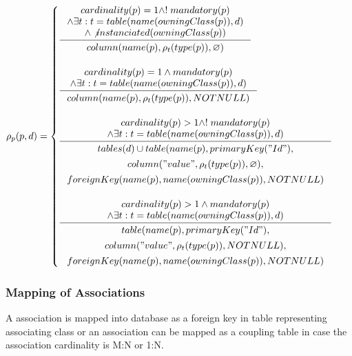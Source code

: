 \documentclass[11pt]{article}
\begin{document}
$\rho_p(p, d) = \begin{cases}
  \inference{cardinality(p) = 1 \wedge !\;mandatory(p)
 \\ \wedge \exists t : t = table(name(owningClass(p)), d) 
 \\ \wedge \not instanciated(owningClass(p))
 }{\begin{gathered}
	  column(name(p), \rho_t(type(p)), \varnothing )
\end{gathered}
 } \\ \\

  \inference{cardinality(p) = 1 \wedge mandatory(p)
 \\ \wedge \exists t : t = table(name(owningClass(p)), d)}{\begin{gathered}
 	 column(name(p), \rho_t(type(p)), NOTNULL ) \\ 
\end{gathered}} 
\\ \\
 
 \inference{ cardinality(p) > 1 \wedge !\;mandatory(p) \\ \wedge \exists t : t = table(name(owningClass(p)), d)}{\begin{gathered}tables(d) \cup  table(name(p), primaryKey("Id"), \\ column("value", \rho_t(type(p)), \varnothing), \\ foreignKey(name(p), name(owningClass(p)), NOTNULL) \\
\end{gathered}}
\\ \\

 \inference{ cardinality(p) > 1 \wedge mandatory(p) \\ \wedge \exists t : t = table(name(owningClass(p)), d) }{\begin{gathered}  table(name(p), primaryKey("Id"), \\ column("value", \rho_t(type(p)), NOTNULL), \\ foreignKey(name(p), name(owningClass(p)), NOTNULL)
	 \end{gathered}}
 \end{cases}$

\subsubsection{Mapping of Associations}
A association is mapped into database as a foreign key in table representing associating class or an association can be mapped as a coupling table in case the association cardinality is M:N or 1:N.
\end{document}
